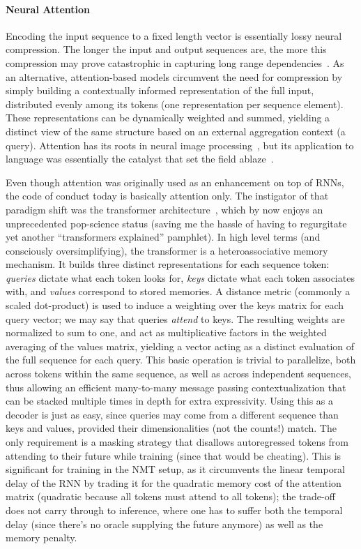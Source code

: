 \paragraph{Neural Attention}
Encoding the input sequence to a fixed length vector is essentially lossy neural compression.
The longer the input and output sequences are, the more this compression may prove catastrophic in capturing long range dependencies~\cite{cho2014properties}.
As an alternative, attention-based models circumvent the need for compression by simply building a contextually informed representation of the full input, distributed evenly among its tokens (one representation per sequence element).
These representations can be dynamically weighted and summed, yielding a distinct view of the same structure based on an external aggregation context (a query).
Attention has its roots in neural image processing~\cite[inter alia]{larochelle2010learning,NIPS2014_09c6c378}, but its application to language was essentially the catalyst that set the field ablaze~\cite{bahdanau2015neural}.

Even though attention was originally used as an enhancement on top of RNNs, the code of conduct today is basically attention only.
The instigator of that paradigm shift was the transformer architecture~\cite{vaswani2017attention}, which by now enjoys an unprecedented pop-science status (saving me the hassle of having to regurgitate yet another ``transformers explained'' pamphlet).
In high level terms (and consciously oversimplifying), the transformer is a heteroassociative memory mechanism.
It builds three distinct representations for each sequence token: \textit{queries} dictate what each token looks for, \textit{keys} dictate what each token associates with, and \textit{values} correspond to stored memories.
A distance metric (commonly a scaled dot-product) is used to induce a weighting over the keys matrix for each query vector; we may say that queries \textit{attend} to keys.
The resulting weights are normalized to sum to one, and act as multiplicative factors in the weighted averaging of the values matrix, yielding a vector acting as a distinct evaluation of the full sequence for each query.
This basic operation is trivial to parallelize, both across tokens within the same sequence, as well as across independent sequences, thus allowing an efficient many-to-many message passing contextualization that can be stacked multiple times in depth for extra expressivity.
Using this as a decoder is just as easy, since queries may come from a different sequence than keys and values, provided their dimensionalities (not the counts!) match.
The only requirement is a masking strategy that disallows autoregressed tokens from attending to their future while training (since that would be cheating).
This is significant for training in the NMT setup, as it circumvents the linear temporal delay of the RNN by trading it for the quadratic memory cost of the attention matrix (quadratic because all tokens must attend to all tokens); the trade-off does not carry through to inference, where one has to suffer both the temporal delay (since there's no oracle supplying the future anymore) as well as the memory penalty.


